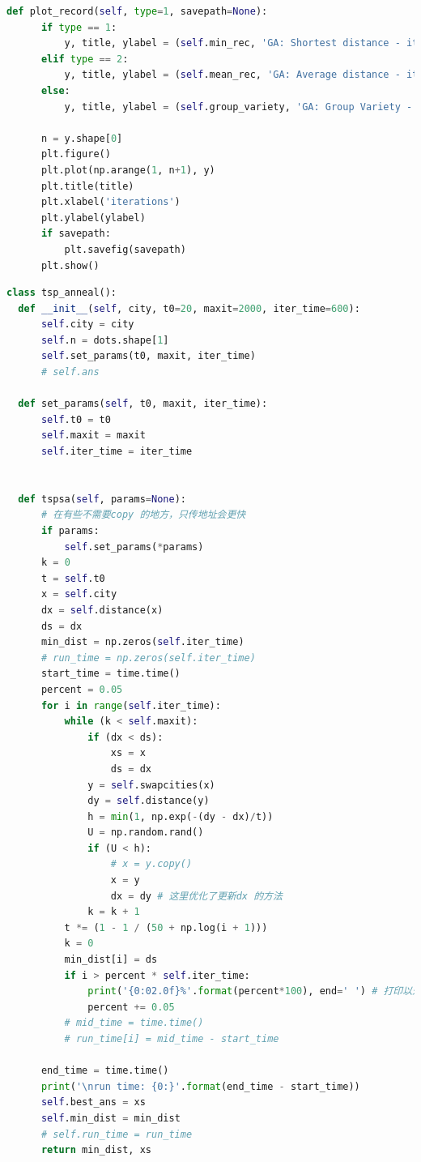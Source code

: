 \documentclass[12pt]{article}
\begin{document}
\begin{lstlisting}[language = Python, caption = GA算法计算TSP的类]
  def plot_record(self, type=1, savepath=None):
      if type == 1:
          y, title, ylabel = (self.min_rec, 'GA: Shortest distance - iterations Graph', 'Shortest distance in the population') 
      elif type == 2:
          y, title, ylabel = (self.mean_rec, 'GA: Average distance - iterations Graph', 'Average distance in the population')
      else:
          y, title, ylabel = (self.group_variety, 'GA: Group Variety - iterations Graph', 'Group Variety in the population')
      
      n = y.shape[0]
      plt.figure()
      plt.plot(np.arange(1, n+1), y)
      plt.title(title)
      plt.xlabel('iterations')
      plt.ylabel(ylabel)
      if savepath:
          plt.savefig(savepath)
      plt.show()
\end{lstlisting}

\begin{lstlisting}[language = Python, caption = SA算法计算TSP问题的类]
  class tsp_anneal():
  def __init__(self, city, t0=20, maxit=2000, iter_time=600):
      self.city = city
      self.n = dots.shape[1]
      self.set_params(t0, maxit, iter_time)
      # self.ans 

  def set_params(self, t0, maxit, iter_time):
      self.t0 = t0
      self.maxit = maxit
      self.iter_time = iter_time
      

  def tspsa(self, params=None):
      # 在有些不需要copy 的地方，只传地址会更快
      if params:
          self.set_params(*params)
      k = 0
      t = self.t0
      x = self.city
      dx = self.distance(x)
      ds = dx
      min_dist = np.zeros(self.iter_time)
      # run_time = np.zeros(self.iter_time)
      start_time = time.time()
      percent = 0.05
      for i in range(self.iter_time):
          while (k < self.maxit):
              if (dx < ds):
                  xs = x
                  ds = dx
              y = self.swapcities(x)
              dy = self.distance(y)
              h = min(1, np.exp(-(dy - dx)/t))
              U = np.random.rand()
              if (U < h):
                  # x = y.copy()
                  x = y
                  dx = dy # 这里优化了更新dx 的方法
              k = k + 1
          t *= (1 - 1 / (50 + np.log(i + 1)))
          k = 0
          min_dist[i] = ds
          if i > percent * self.iter_time:
              print('{0:02.0f}%'.format(percent*100), end=' ') # 打印以追踪进度
              percent += 0.05
          # mid_time = time.time()
          # run_time[i] = mid_time - start_time

      end_time = time.time()
      print('\nrun time: {0:}'.format(end_time - start_time))
      self.best_ans = xs
      self.min_dist = min_dist
      # self.run_time = run_time
      return min_dist, xs



\end{lstlisting}
\end{document}
